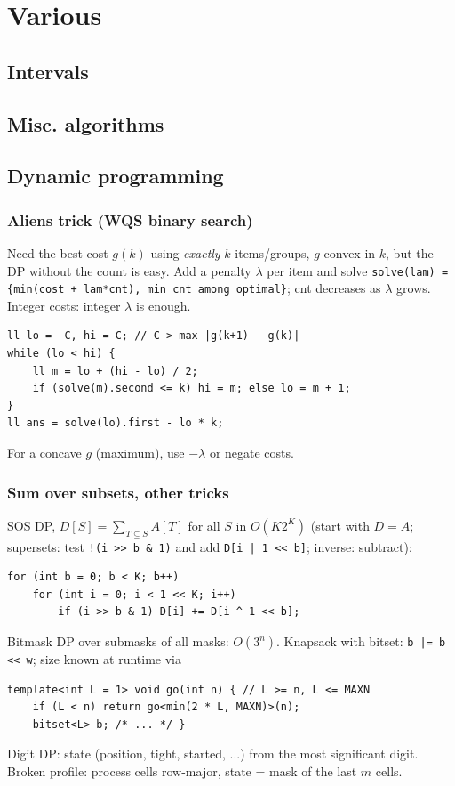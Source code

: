 \chapter{Various}

\section{Intervals}

\section{Misc. algorithms}

\section{Dynamic programming}
	\subsection{Aliens trick (WQS binary search)}
		\label{sec:aliens}
		Need the best cost $g(k)$ using \emph{exactly} $k$ items/groups, $g$ convex in $k$, but the DP
		without the count is easy. Add a penalty $\lambda$ per item and solve
		\texttt{solve(lam) = \{min(cost + lam*cnt), min cnt among optimal\}};
		cnt decreases as $\lambda$ grows. Integer costs: integer $\lambda$ is enough.
		\begin{lstlisting}
ll lo = -C, hi = C; // C > max |g(k+1) - g(k)|
while (lo < hi) {
	ll m = lo + (hi - lo) / 2;
	if (solve(m).second <= k) hi = m; else lo = m + 1;
}
ll ans = solve(lo).first - lo * k;
		\end{lstlisting}
		For a concave $g$ (maximum), use $-\lambda$ or negate costs.
	\subsection{Sum over subsets, other tricks}
		SOS DP, $D[S] = \sum_{T \subseteq S} A[T]$ for all $S$ in $O(K 2^K)$ (start with $D = A$;
		supersets: test \texttt{!(i >{}> b \& 1)} and add \texttt{D[i | 1 <{}< b]}; inverse: subtract):
		\begin{lstlisting}
for (int b = 0; b < K; b++)
	for (int i = 0; i < 1 << K; i++)
		if (i >> b & 1) D[i] += D[i ^ 1 << b];
		\end{lstlisting}
		Bitmask DP over submasks of all masks: $O(3^n)$. Knapsack with bitset:
		\texttt{b |= b <{}< w}; size known at runtime via
		\begin{lstlisting}
template<int L = 1> void go(int n) { // L >= n, L <= MAXN
	if (L < n) return go<min(2 * L, MAXN)>(n);
	bitset<L> b; /* ... */ }
		\end{lstlisting}
		Digit DP: state (position, tight, started, ...) from the most significant digit.
		Broken profile: process cells row-major, state = mask of the last $m$ cells.

